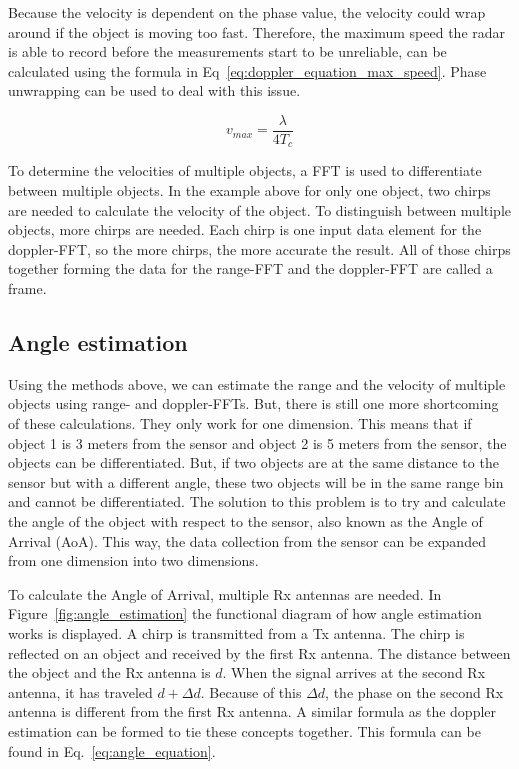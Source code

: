Because the velocity is dependent on the phase value, the velocity could wrap around if the object is moving too fast. Therefore, the maximum speed the radar is able to record before the measurements start to be unreliable, can be calculated using the formula in Eq~\ref{eq:doppler_equation_max_speed}. Phase unwrapping can be used to deal with this issue.

\begin{equation}
v_{max} = \frac{\lambda}{4 T_c}
\label{eq:doppler_equation_max_speed}
\end{equation}

To determine the velocities of multiple objects, a FFT is used to differentiate between multiple objects. In the example above for only one object, two chirps are needed to calculate the velocity of the object. To distinguish between multiple objects, more chirps are needed. Each chirp is one input data element for the doppler-FFT, so the more chirps, the more accurate the result. All of those chirps together forming the data for the range-FFT and the doppler-FFT are called a frame. 

\subsection{Angle estimation}
\label{sec:angle_estimation}
Using the methods above, we can estimate the range and the velocity of multiple objects using range- and doppler-FFTs. But, there is still one more shortcoming of these calculations. They only work for one dimension. This means that if object 1 is 3 meters from the sensor and object 2 is 5 meters from the sensor, the objects can be differentiated. But, if two objects are at the same distance to the sensor but with a different angle, these two objects will be in the same range bin and cannot be differentiated. The solution to this problem is to try and calculate the angle of the object with respect to the sensor, also known as the Angle of Arrival (AoA). This way, the data collection from the sensor can be expanded from one dimension into two dimensions.

To calculate the Angle of Arrival, multiple Rx antennas are needed. In Figure~\ref{fig:angle_estimation} the functional diagram of how angle estimation works is displayed. A chirp is transmitted from a Tx antenna. The chirp is reflected on an object and received by the first Rx antenna. The distance between the object and the Rx antenna is $d$. When the signal arrives at the second Rx antenna, it has traveled $d + \Delta d$. Because of this $\Delta d$, the phase on the second Rx antenna is different from the first Rx antenna. A similar formula as the doppler estimation can be formed to tie these concepts together. This formula can be found in Eq.~\ref{eq:angle_equation}.

